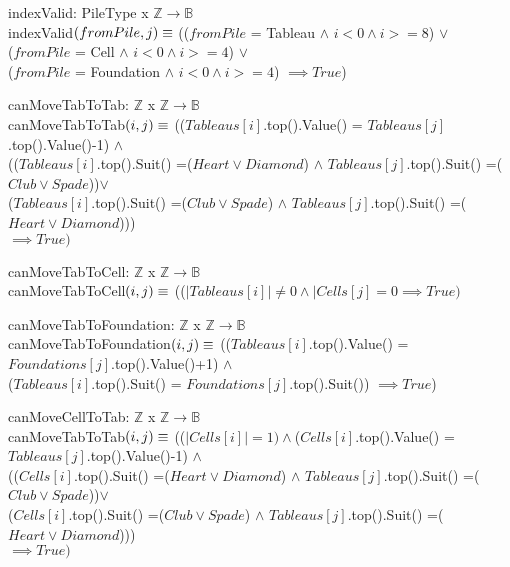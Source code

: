 \documentclass[12pt]{article}
\begin{document}
\bigskip
\noindent indexValid: PileType x $\mathbb{Z}$$\rightarrow \mathbb{B}$\\
indexValid$(fromPile, j)\\
\equiv$ (($fromPile$ = Tableau $\land$ $ i < 0 \land i >= 8$) $\lor$ \\
($fromPile$ = Cell $\land$ $ i < 0 \land i >= 4$) $\lor$\\
($fromPile$ = Foundation $\land$ $ i < 0 \land i >= 4$) $\implies True$)

\bigskip
\noindent canMoveTabToTab: $\mathbb{Z}$ x $\mathbb{Z}$$\rightarrow \mathbb{B}$\\
canMoveTabToTab$(i, j)\\
\equiv$ (($Tableaus[i]$.top().Value() = $Tableaus[j]$.top().Value()-1) $\land$\\
(($Tableaus[i]$.top().Suit() =($Heart \lor Diamond$) $\land$ $Tableaus[j]$.top().Suit() =($Club \lor Spade$))$\lor$\\
($Tableaus[i]$.top().Suit() =($Club \lor Spade$) $\land$ $Tableaus[j]$.top().Suit() =($Heart \lor Diamond$)))\\
$\implies True)$

\bigskip
\noindent canMoveTabToCell: $\mathbb{Z}$ x $\mathbb{Z}$$\rightarrow \mathbb{B}$\\
canMoveTabToCell$(i, j)\\
\equiv$ (($|Tableaus[i]| \neq 0 \land |Cells[j] = 0 \implies True)$

\bigskip
\noindent canMoveTabToFoundation: $\mathbb{Z}$ x $\mathbb{Z}$$\rightarrow \mathbb{B}$\\
canMoveTabToFoundation$(i, j)\\
\equiv$ (($Tableaus[i]$.top().Value() = $Foundations[j]$.top().Value()+1) $\land$\\
($Tableaus[i]$.top().Suit() = $Foundations[j]$.top().Suit()) $\implies True$)

\bigskip
\noindent canMoveCellToTab: $\mathbb{Z}$ x $\mathbb{Z}$$\rightarrow \mathbb{B}$\\
canMoveTabToTab$(i, j)\\
\equiv$ (($|Cells[i]| = 1) \land $($Cells[i]$.top().Value() = $Tableaus[j]$.top().Value()-1) $\land$\\
(($Cells[i]$.top().Suit() =($Heart \lor Diamond$) $\land$ $Tableaus[j]$.top().Suit() =($Club \lor Spade$))$\lor$\\
($Cells[i]$.top().Suit() =($Club \lor Spade$) $\land$ $Tableaus[j]$.top().Suit() =($Heart \lor Diamond$)))\\
$\implies True)$
\end{document}
